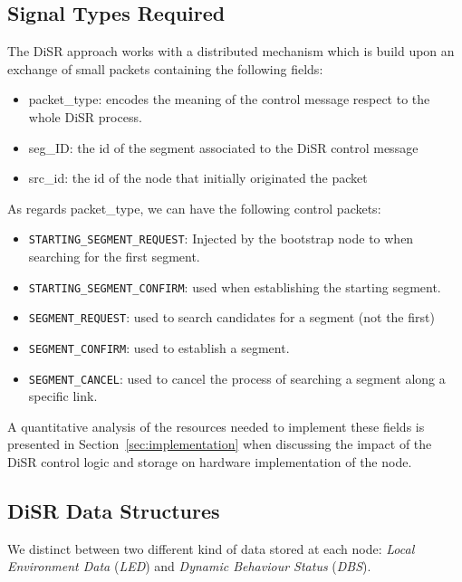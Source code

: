 
\subsection{Signal Types Required}

The DiSR approach works with a distributed mechanism which is build
upon an exchange of small packets containing the following fields:
\begin{itemize}
\item{packet\_type}: encodes the meaning of the control message respect
to the whole DiSR process.
\item{seg\_ID}: the id of the segment associated to the DiSR control message
\item{src\_id}: the id of the node that initially originated the
packet
\end{itemize}

As regards packet\_type, we can have the following control packets:
\begin{itemize}
\item{\texttt{STARTING\_SEGMENT\_REQUEST}}: Injected by the bootstrap
node to when searching for the first segment. 
\item{\texttt{STARTING\_SEGMENT\_CONFIRM}}: used when establishing
the starting  segment. 
\item{\texttt{SEGMENT\_REQUEST}}: used to search candidates for a segment (not the
first)
\item{\texttt{SEGMENT\_CONFIRM}}: used to establish a segment. 
\item{\texttt{SEGMENT\_CANCEL}}: used to cancel the process of searching a segment along a
specific link.
\end{itemize}

A quantitative analysis of the resources needed to implement these
fields is presented in Section~\ref{sec:implementation} when
discussing the impact of the DiSR control logic and storage on
hardware implementation of the node.

\subsection{DiSR Data Structures}
\label{ssec:disr_dstruct}

We distinct between two different kind of data stored at each node:
\emph{Local Environment Data} (\emph{LED}) and \emph{Dynamic Behaviour
Status} (\emph{DBS}).

